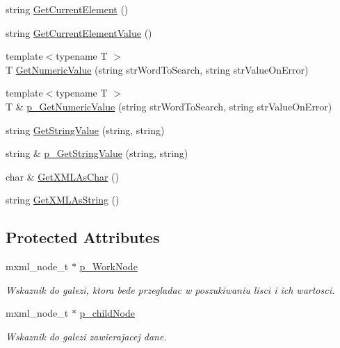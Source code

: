 \begin{DoxyCompactItemize}
\item 
string \hyperlink{classXMLParser_a800ac601a76d6ced7b7f79268b95077e}{GetCurrentElement} ()
\item 
string \hyperlink{classXMLParser_a0e2b4757fe54a8166f1e1eea31af1da3}{GetCurrentElementValue} ()
\item 
{\footnotesize template$<$typename T $>$ }\\T \hyperlink{classXMLParser_aa5edec062cd6333162a4c1906e55f9f0}{GetNumericValue} (string strWordToSearch, string strValueOnError)
\item 
{\footnotesize template$<$typename T $>$ }\\T \& \hyperlink{classXMLParser_adb8af1fd3397c7e39e95a4e336afc445}{p\_\-GetNumericValue} (string strWordToSearch, string strValueOnError)
\item 
string \hyperlink{classXMLParser_a055eba0b19ffb778cb3d2e5eb958c8ab}{GetStringValue} (string, string)
\item 
string \& \hyperlink{classXMLParser_aaf87e1c22bbd0b91b2facef25f4b5965}{p\_\-GetStringValue} (string, string)
\item 
char \& \hyperlink{classXMLParser_a986fd0d42f960d80fbc8bbab76757600}{GetXMLAsChar} ()
\item 
string \hyperlink{classXMLParser_af3a6c6210160027795f1261524f76ea3}{GetXMLAsString} ()
\end{DoxyCompactItemize}
\subsection*{Protected Attributes}
\begin{DoxyCompactItemize}
\item 
\hypertarget{classXMLParser_abb381f2220e4b0130644494cdd3a5454}{
mxml\_\-node\_\-t $\ast$ \hyperlink{classXMLParser_abb381f2220e4b0130644494cdd3a5454}{p\_\-WorkNode}}
\label{classXMLParser_abb381f2220e4b0130644494cdd3a5454}

\begin{DoxyCompactList}\small\item\em Wskaznik do galezi, ktora bede przegladac w poszukiwaniu lisci i ich wartosci. \item\end{DoxyCompactList}\item 
\hypertarget{classXMLParser_a479311b5147f4f8ed5559bafb2cc1c69}{
mxml\_\-node\_\-t $\ast$ \hyperlink{classXMLParser_a479311b5147f4f8ed5559bafb2cc1c69}{p\_\-childNode}}
\label{classXMLParser_a479311b5147f4f8ed5559bafb2cc1c69}

\begin{DoxyCompactList}\small\item\em Wskaznik do galezi zawierajacej dane. \item\end{DoxyCompactList}\end{DoxyCompactItemize}


